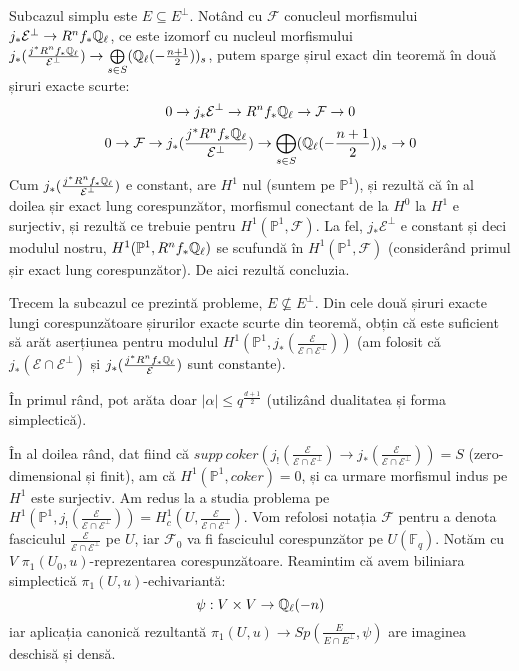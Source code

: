 \documentclass[13pt,openany]{book}
\begin{document}
Subcazul simplu este $E \subseteq E^\perp$. Notând cu $\mathcal{F}$ conucleul morfismului $j_* \mathcal{E}^\perp \rightarrow R^n f_* \mathbb{Q}_\ell$, ce este izomorf cu nucleul morfismului $j_*(\frac{j^* R^n f_* \mathbb{Q}_\ell}{\mathcal{E}^\perp}) \rightarrow \bigoplus\limits_{s\in S} (\mathbb{Q}_\ell(-\frac{n+1}{2}))_s$, putem sparge șirul exact din teoremă în două șiruri exacte scurte:
$$0 \rightarrow j_* \mathcal{E}^\perp \rightarrow R^n f_* \mathbb{Q}_\ell \rightarrow \mathcal{F} \rightarrow 0$$
$$0 \rightarrow \mathcal{F} \rightarrow j_*(\frac{j^* R^n f_* \mathbb{Q}_\ell}{\mathcal{E}^\perp}) \rightarrow \bigoplus\limits_{s\in S} (\mathbb{Q}_\ell(-\frac{n+1}{2}))_s \rightarrow 0$$
Cum $ j_*(\frac{j^* R^n f_* \mathbb{Q}_\ell}{\mathcal{E}^\perp})$ e constant, are $H^1$ nul (suntem pe $\mathbb{P}^1$), și rezultă că în al doilea șir exact lung corespunzător, morfismul conectant de la $H^0$ la $H^1$ e surjectiv, și rezultă ce trebuie pentru $H^1(\mathbb{P}^1,\mathcal{F})$. La fel, $ j_* \mathcal{E}^\perp$ e constant și deci modulul nostru, $H^1(\mathbb{P}^1,R^n f_* \mathbb{Q}_\ell)$ se scufundă în $H^1(\mathbb{P}^1,\mathcal{F})$ (considerând primul șir exact lung corespunzător). De aici rezultă concluzia.

Trecem la subcazul ce prezintă probleme, $E \nsubseteq E^\perp$. Din cele două șiruri exacte lungi corespunzătoare șirurilor exacte scurte din teoremă, obțin că este suficient să arăt aserțiunea pentru modulul $H^1(\mathbb{P}^1,j_*(\frac{\mathcal{E}}{\mathcal{E} \cap \mathcal{E}^\perp}))$ (am folosit că $j_*(\mathcal{E} \cap \mathcal{E}^\perp)$ și $j_*(\frac{j^* R^n f_* \mathbb{Q}_\ell}{\mathcal{E}})$ sunt constante).

În primul rând, pot arăta doar $|\alpha|\leq q^{\frac{d+1}{2}}$ (utilizând dualitatea și forma simplectică).

În al doilea rând, dat fiind că $supp\ coker(j_!(\frac{\mathcal{E}}{\mathcal{E} \cap \mathcal{E}^\perp}) \rightarrow j_*(\frac{\mathcal{E}}{\mathcal{E} \cap \mathcal{E}^\perp})) = S$ (zero-dimensional și finit), am că $H^1(\mathbb{P}^1,coker)=0$, și ca urmare morfismul indus pe $H^1$ este surjectiv. Am redus la a studia problema pe $H^1(\mathbb{P}^1,j_!(\frac{\mathcal{E}}{\mathcal{E} \cap \mathcal{E}^\perp})) = H^1_c (U, \frac{\mathcal{E}}{\mathcal{E} \cap \mathcal{E}^\perp})$. Vom refolosi notația $\mathcal{F}$ pentru a denota fasciculul $\frac{\mathcal{E}}{\mathcal{E} \cap \mathcal{E}^\perp}$ pe $U$, iar $\mathcal{F}_0$ va fi fasciculul corespunzător pe $U(\mathbb{F}_q)$. Notăm cu $V$ $\pi_1(U_0,u)$-reprezentarea corespunzătoare. Reamintim că avem biliniara simplectică $\pi_1(U,u)$-echivariantă:
$$\psi : V \times V \rightarrow \mathbb{Q}_\ell(-n)$$
iar aplicația canonică rezultantă $\pi_1(U,u) \rightarrow Sp(\frac{E}{E \cap E^\perp},\psi)$ are imaginea deschisă și densă.
\end{document}
